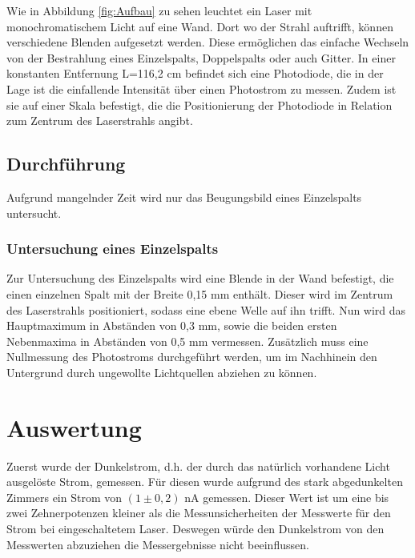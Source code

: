 \documentclass[titlepage = firstcover]{scrartcl}
\begin{document}
            \FloatBarrier
        
            \noindent

            Wie in Abbildung \ref{fig:Aufbau} zu sehen leuchtet ein Laser mit monochromatischem Licht auf eine Wand. Dort wo der Strahl auftrifft, können verschiedene Blenden aufgesetzt werden. Diese
            ermöglichen das einfache Wechseln von der Bestrahlung eines Einzelspalts, Doppelspalts oder auch Gitter. In einer konstanten Entfernung L=116,2 cm befindet sich eine Photodiode, die in der Lage
            ist die einfallende Intensität über einen Photostrom zu messen. Zudem ist sie auf einer Skala befestigt, die die Positionierung der Photodiode in Relation zum Zentrum des Laserstrahls
            angibt.
            
        \subsection{Durchführung}
            Aufgrund mangelnder Zeit wird nur das Beugungsbild eines Einzelspalts untersucht.
            \subsubsection*{Untersuchung eines Einzelspalts}
                Zur Untersuchung des Einzelspalts wird eine Blende in der Wand befestigt, die einen einzelnen Spalt mit der Breite 0,15 mm enthält. Dieser wird im Zentrum des
                Laserstrahls positioniert, sodass eine ebene Welle auf ihn trifft. Nun wird das Hauptmaximum in Abständen von 0,3 mm, sowie die beiden ersten Nebenmaxima in Abständen von 0,5 mm 
                vermessen. Zusätzlich muss eine Nullmessung des Photostroms durchgeführt werden, um im Nachhinein den Untergrund durch ungewollte Lichtquellen abziehen zu können. 


    \newpage
    \section{Auswertung}
        Zuerst wurde der Dunkelstrom, d.h. der durch das natürlich vorhandene Licht ausgelöste Strom, gemessen.
        Für diesen wurde aufgrund des stark abgedunkelten Zimmers ein Strom von $(1 \pm 0,2)$ nA gemessen.
        Dieser Wert ist um eine bis zwei Zehnerpotenzen kleiner als die Messunsicherheiten der Messwerte für den Strom bei eingeschaltetem Laser.
        Deswegen würde den Dunkelstrom von den Messwerten abzuziehen die Messergebnisse nicht beeinflussen.
\end{document}
